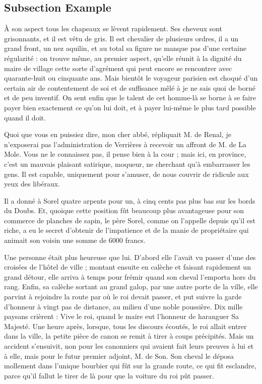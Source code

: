 \documentclass[english]{article}
\begin{document}
\subsection{Subsection Example}

À son aspect tous les chapeaux se lèvent rapidement. Ses cheveux sont
grisonnants, et il est vêtu de gris. Il est chevalier de plusieurs ordres, il a
un grand front, un nez aquilin, et au total sa figure ne manque pas d’une
certaine régularité : on trouve même, au premier aspect, qu’elle réunit à la
dignité du maire de village cette sorte d’agrément qui peut encore se rencontrer
avec quarante-huit ou cinquante ans. Mais bientôt le voyageur parisien est
choqué d’un certain air de contentement de soi et de suffisance mêlé à je ne
sais quoi de borné et de peu inventif. On sent enfin que le talent de cet
homme-là se borne à se faire payer bien exactement ce qu’on lui doit, et à payer
lui-même le plus tard possible quand il doit.

Quoi que vous en puissiez dire, mon cher abbé, répliquait M. de Renal, je
n’exposerai pas l’administration de Verrières à recevoir un affront de M. de La
Mole. Vous ne le connaissez pas, il pense bien à la cour ; mais ici, en
province, c’est un mauvais plaisant satirique, moqueur, ne cherchant qu’à
embarrasser les gens. Il est capable, uniquement pour s’amuser, de nous couvrir
de ridicule aux yeux des libéraux.

Il a donné à Sorel quatre arpents pour un, à cinq cents pas plus bas sur les
bords du Doubs. Et, quoique cette position fût beaucoup plus avantageuse pour
son commerce de planches de sapin, le père Sorel, comme on l’appelle depuis
qu’il est riche, a eu le secret d’obtenir de l’impatience et de la manie de
propriétaire qui animait son voisin une somme de 6000 francs.

Une personne était plus heureuse que lui. D’abord elle l’avait vu passer d’une
des croisées de l’hôtel de ville ; montant ensuite en calèche et faisant
rapidement un grand détour, elle arriva à temps pour frémir quand son cheval
l’emporta hors du rang. Enfin, sa calèche sortant au grand galop, par une autre
porte de la ville, elle parvint à rejoindre la route par où le roi devait
passer, et put suivre la garde d’honneur à vingt pas de distance, au milieu
d’une noble poussière. Dix mille paysans crièrent : Vive le roi, quand le maire
eut l’honneur de haranguer Sa Majesté. Une heure après, lorsque, tous les
discours écoutés, le roi allait entrer dans la ville, la petite pièce de canon
se remit à tirer à coups précipités. Mais un accident s’ensuivit, non pour les
canonniers qui avaient fait leurs preuves à lui et à elle, mais pour
le futur premier adjoint, M. de Son. Son cheval le déposa mollement dans
l’unique bourbier qui fût sur la grande route, ce qui fit esclandre, parce qu’il
fallut le tirer de là pour que la voiture du roi pût passer.
\end{document}
